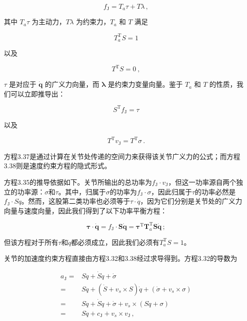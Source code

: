 \documentclass[10pt,a4paper]{book}
\theoremstyle{thmstyle} %
\theoremstyle{defstyle} %
\theoremstyle{prostyle} %
\begin{document}
$$
f _ { \mathrm { J } } = T _ { a } \tau + T \lambda \, ,
$$



其中 $T_{a}\tau$ 为主动力，$T\lambda$ 为约束力，$T_{a}$ 和 $T$ 满足



$$
T _ { a } ^{\mathrm { T} } S = 1
$$



以及



$$
T ^{\mathrm { T} } S = 0 \ ,
$$



$\tau$ 是对应于 $\dot{\boldsymbol{q}}$ 的广义力向量，而 $\boldsymbol{\lambda}$ 是约束力变量向量。鉴于 $T_{a}$ 和 $T$ 的性质，我们可以立即推导出：



$$
S ^{\mathrm { T} } f _ { \mathrm { J } } = \tau
$$



以及



$$
T ^{\mathrm { T} } v _ { \mathrm { J } } = T ^{\mathrm { T} } \sigma \, .
$$



方程3.37是通过计算在关节处传递的空间力来获得该关节广义力的公式；而方程3.38则是速度约束方程的隐式形式。



方程3.35的推导依据如下。关节所输出的总功率为$f_{\mathrm{J}} \cdot v_{\mathrm{J}}$，但这一功率源自两个独立的功率源：$\sigma$和$\tau$。其中，归属于$\sigma$的功率为$f_{\mathrm{J}} \cdot \sigma$，因此归属于$\tau$的功率必然是$f_{\mathrm{J}} \cdot S \dot{q}$。然而，这股第二类功率也必须等于$\tau \cdot \dot{q}$，因为它们分别是关节处的广义力向量与速度向量，因此我们得到了以下功率平衡方程：



$$
\boldsymbol { \tau } \cdot \dot { \boldsymbol { q } } = f _ { \mathrm { J } } \cdot \boldsymbol { S } \dot { \boldsymbol { q } } = \boldsymbol { \tau } ^{\mathrm { T} } \boldsymbol { T } _ { a } ^{\mathrm { T} } \boldsymbol { S } \dot { \boldsymbol { q } } \, ;
$$



但该方程对于所有$\tau$和$\dot{q}$都必须成立，因此我们必须有$T_{a}^{\mathrm{T}}S=1$。



关节的加速度约束方程直接由方程3.32和3.38经过求导得到。方程3.32的导数为



$$
\begin{array}{rl} { a _ { \mathrm { J } } = } & { S \ddot { q } + \dot { S } \dot { q } + \dot { \sigma } } \\{ = } & { S \ddot { q } + ( \dot { S } + v _ { s } \times S ) \dot { q } + ( \dot { \sigma } + v _ { s } \times \sigma ) } \\{ = } & { S \ddot { q } + \dot { S } \dot { q } + \dot { \sigma } + v _ { s } \times ( S \dot { q } + \sigma ) } \\{ = } & { S \ddot { q } + c _ { \mathrm { J } } + v _ { s } \times v _ { \mathrm { J } } \, , } \end{array}
$$
\end{document}
